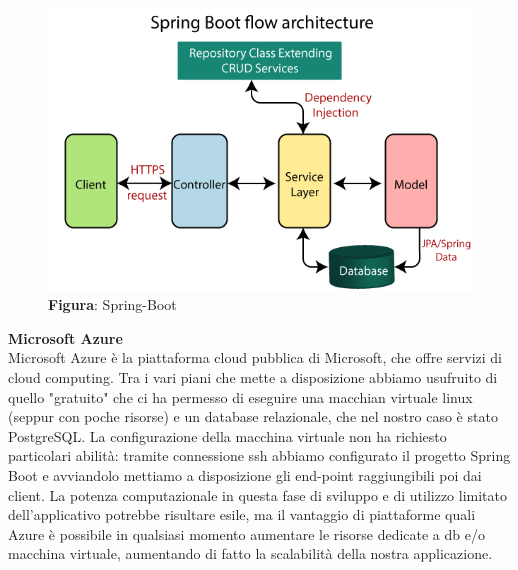     \begin{figure}[H]
        \centering
        \includegraphics[scale=0.3]{assets/immagini varie/spring-boot-architecture2.png}
        \caption*{\textbf{Figura}: Spring-Boot}\label{fig:spring_Arch}
    \end{figure}
    \newpage

    \begin{flushleft}
        \textbf{Microsoft Azure}\\
        Microsoft Azure è la piattaforma cloud pubblica di Microsoft, che offre servizi di cloud computing. Tra i vari piani che mette a disposizione abbiamo usufruito
        di quello "gratuito" che ci ha permesso di eseguire una macchian virtuale linux (seppur con poche risorse) e un database relazionale, che nel nostro caso è stato PostgreSQL.
        La configurazione della macchina virtuale non ha richiesto particolari abilità: tramite connessione ssh abbiamo configurato il progetto Spring Boot e avviandolo 
        mettiamo a disposizione gli end-point raggiungibili poi dai client.
        La potenza computazionale in questa fase di sviluppo e di utilizzo limitato dell'applicativo potrebbe risultare esile, ma il vantaggio di piattaforme quali
        Azure è possibile in qualsiasi momento aumentare le risorse dedicate a db e/o macchina virtuale, aumentando di fatto la scalabilità della nostra applicazione.
        
    \end{flushleft}

